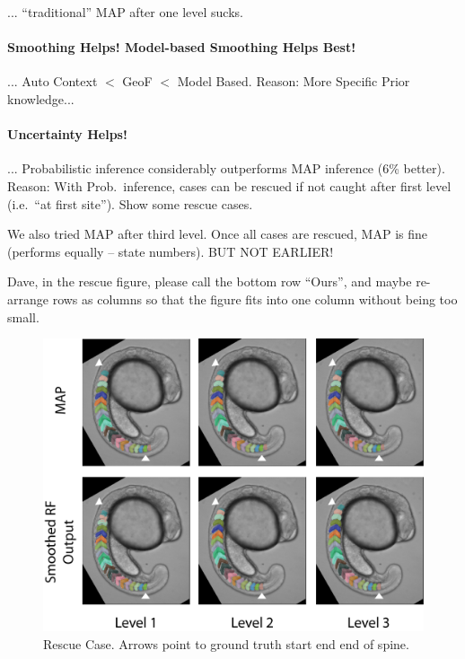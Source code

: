 \documentclass[10pt,twocolumn,letterpaper]{article}
\begin{document}
... "`traditional"' MAP after one level sucks. 

\paragraph{Smoothing Helps! Model-based Smoothing Helps Best!}
... Auto Context $<$ GeoF $<$ Model Based. Reason: More Specific Prior knowledge...

\paragraph{Uncertainty Helps!}
... Probabilistic inference considerably outperforms MAP inference (6\% better). Reason: With Prob.\ inference, cases can be rescued if not caught after first level (i.e.\ "`at first site"'). Show some rescue cases. 

We also tried MAP after third level. Once all cases are rescued, MAP is fine (performs equally -- state numbers). BUT NOT EARLIER!

Dave, in the rescue figure, please call the bottom row "`Ours"', and maybe re-arrange rows as columns so that the figure fits into one column without being too small. 
\begin{figure}[t]
\begin{center}
\includegraphics[width=\columnwidth]{rescue.png} %
\caption{Rescue Case. Arrows point to ground truth start end end of spine. }
\label{fig:rescue}
\end{center}
\end{figure}



{\small


}
\end{document}

